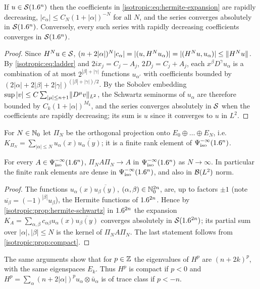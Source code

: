 \begin{proposition}\label{isotropic:prop:hermite-schwartz}
If $u\in\mathcal{S}(1.6^n)$ then the coefficients in \eqref{isotropic:eq:hermite-expansion}
are rapidly decreasing, $|c_\alpha|\le C_N(1+|\alpha|)^{-N}$ for all $N$, and the
series converges absolutely in $\mathcal{S}(1.6^n)$. Conversely, every such series
with rapidly decreasing coefficients converges in $\mathcal{S}(1.6^n)$.
\end{proposition}
\begin{proof}
Since $H^Nu\in\mathcal{S}$,
$(n+2|\alpha|)^N|c_\alpha|=|(u,H^Nu_\alpha)|=|(H^Nu,u_\alpha)|\le\lVert H^Nu\rVert$. By
\eqref{isotropic:eq:ladder} and $2ix_j=C_j-A_j$, $2D_j=C_j+A_j$, each
$x^\beta D^\gamma u_\alpha$ is a combination of at most $2^{|\beta|+|\gamma|}$ functions
$u_{\alpha'}$ with coefficients bounded by $(2|\alpha|+2|\beta|+2|\gamma|)^{(|\beta|+|\gamma|)/2}$.
By the Sobolev embedding
$\sup|v|\le C\sum_{|\mu|\le n+1}\lVert D^\mu v\rVert_{L^2}$, the Schwartz seminorms of
$u_\alpha$ are therefore bounded by $C_k(1+|\alpha|)^{M_k}$, and the series
converges absolutely in $\mathcal{S}$ when the coefficients are rapidly decreasing;
its sum is $u$ since it converges to $u$ in $L^2$.
\end{proof}

For $N\in\mathbb{N}_0$ let $\Pi_N$ be the orthogonal projection onto
$E_0\oplus\dots\oplus E_N$, i.e.\ $K_{\Pi_N}=\sum_{|\alpha|\le N}u_\alpha(x)\overline{u_\alpha(y)}$;
it is a finite rank element of $\Psi^{-\infty}_{\mathrm{iso}}(1.6^n)$.

\begin{corollary}\label{isotropic:cor:finite-rank-dense}
For every $A\in\Psi^{-\infty}_{\mathrm{iso}}(1.6^n)$, $\Pi_NA\Pi_N\to A$ in
$\Psi^{-\infty}_{\mathrm{iso}}(1.6^n)$ as $N\to\infty$. In particular the finite rank
elements are dense in $\Psi^{-\infty}_{\mathrm{iso}}(1.6^n)$, and also in $\mathcal{B}(L^2)$ norm.
\end{corollary}
\begin{proof}
The functions $u_\alpha(x)\overline{u_\beta(y)}$, $(\alpha,\beta)\in\mathbb{N}_0^{2n}$, are,
up to factors $\pm1$ (note $\overline{u_\beta}=(-1)^{|\beta|}u_\beta$), the
Hermite functions of $1.6^{2n}$. Hence by
\cref{isotropic:prop:hermite-schwartz} in $1.6^{2n}$ the expansion
$K_A=\sum_{\alpha,\beta}c_{\alpha\beta}u_\alpha(x)\overline{u_\beta(y)}$ converges
absolutely in $\mathcal{S}(1.6^{2n})$; its partial sum over $|\alpha|,|\beta|\le N$ is the
kernel of $\Pi_NA\Pi_N$. The last statement follows from
\cref{isotropic:prop:compact}.
\end{proof}

\begin{remark}\label{isotropic:rem:HO-powers}
The same arguments show that for $p\in\mathbb{Z}$ the eigenvalues of $H^p$ are
$(n+2k)^p$, with the same eigenspaces $E_k$. Thus $H^p$ is compact if $p<0$ and
$H^p=\sum_\alpha(n+2|\alpha|)^pu_\alpha\otimes\bar u_\alpha$ is of trace class if $p<-n$.
\end{remark}

